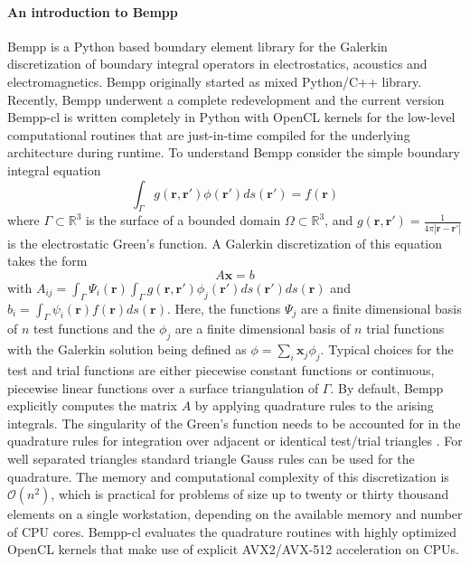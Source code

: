 \paragraph{An introduction to Bempp}
Bempp \cite{Betcke2021} is a Python based boundary element library for the Galerkin discretization of boundary integral operators in electrostatics, acoustics and electromagnetics.
Bempp originally started as mixed Python/C++ library.
Recently, Bempp underwent a complete redevelopment and the current version Bempp-cl is written completely in Python with OpenCL kernels for the low-level computational routines that are just-in-time compiled for the underlying architecture during runtime.
To understand Bempp consider the simple boundary integral equation
$$
\int_{\Gamma} g(\mathbf{r}, \mathbf{r'}) \phi(\mathbf{r'})ds(\mathbf{r'}) = f(\mathbf{r})
$$
where $\Gamma\subset\mathbb{R}^3$ is the surface of a bounded domain $\Omega\subset\mathbb{R}^3$, and $g(\mathbf{r}, \mathbf{r'}) = \frac{1}{4\pi|\mathbf{r}-\mathbf{r'}|}$ is the electrostatic Green's function.
A Galerkin discretization of this equation takes the form
$$
A\mathbf{x} = b
$$
with $A_{ij} = \int_{\Gamma}\Psi_i(\mathbf{r})\int_{\Gamma}g(\mathbf{r}, \mathbf{r'})\phi_j(\mathbf{r'})ds(\mathbf{r'})ds(\mathbf{r})$ and $b_i = \int_{\Gamma}\psi_i(\mathbf{r})f(\mathbf{r})ds(\mathbf{r})$.
Here, the functions $\Psi_j$ are a finite dimensional basis of $n$ test functions and the $\phi_j$ are a finite dimensional basis of $n$ trial functions with the Galerkin solution being defined as $\phi=\sum_{i}\mathbf{x}_j\phi_j$.
Typical choices for the test and trial functions are either piecewise constant functions or continuous, piecewise linear functions over a surface triangulation of $\Gamma$. 
By default, Bempp explicitly computes the matrix $A$ by applying quadrature rules to the arising integrals.
The singularity of the Green's function needs to be accounted for in the quadrature rules for integration over adjacent or identical test/trial triangles \cite{ERICHSEN1998215}.
For well separated triangles standard triangle Gauss rules can be used for the quadrature.
The memory and computational complexity of this discretization is $\mathcal{O}(n^2)$, which is practical for problems of size up to twenty or thirty thousand elements on a single workstation, depending on the available memory and number of CPU cores.
Bempp-cl evaluates the quadrature routines with highly optimized OpenCL kernels that make use of explicit AVX2/AVX-512 acceleration on CPUs.

